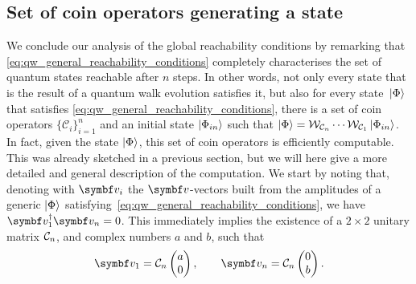 \subsection{Set of coin operators generating a state}
\label{sec:qw_coin_operators_generating_state}
We conclude our analysis of the global reachability conditions by remarking that \cref{eq:qw_general_reachability_conditions} completely characterises the set of quantum states reachable after $n$ steps.
In other words, not only every state that is the result of a quantum walk evolution satisfies it, but also for every state $\ket*{\Phi}$ that satisfies \cref{eq:qw_general_reachability_conditions}, there is a set of coin operators $\{ \mathcal C_i \}_{i=1}^n$ and an initial state $\ket{\Phi_{in}}$ such that
$\ket\Phi = 
	\mathcal W_{\mathcal C_n} \cdots \mathcal W_{\mathcal C_1}
	\ket{\Phi_{in}}$.
In fact, given the state $\ket\Phi$, this set of coin operators is efficiently computable.
This was already sketched in a previous section, but we will here give a more detailed and general description of the computation.
We start by noting that,
denoting with $\bs v_i$ the $\bs v$-vectors built from the amplitudes of a generic $\ket{\Phi}$ satisfying~\cref{eq:qw_general_reachability_conditions}, we have $\bs v_1^\dagger \bs v_n = 0$.
This immediately implies the existence of a $2\times2$ unitary matrix ${\mathcal{C}}_n$, and complex numbers $a$ and $b$, such that
\begin{equation}
	\bs v_1 = \mathcal C_n
	\begin{pmatrix} a \\ 0 \end{pmatrix},
	\qquad
	\bs v_n = \mathcal C_n
	\begin{pmatrix} 0 \\ b \end{pmatrix}.
	\label{eq:equations_giving_C}
\end{equation}
